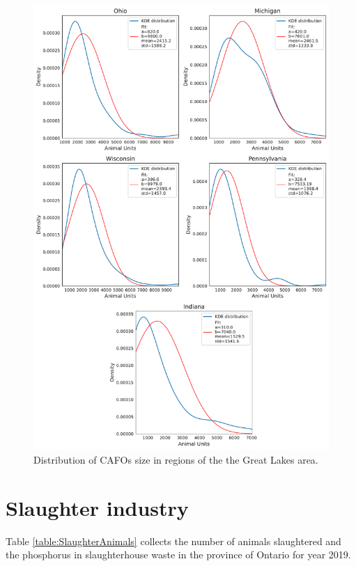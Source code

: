 \documentclass[authoryear]{elsarticle}
\begin{document}
\begin{figure}[H]
	\centering
	\includegraphics[width=0.81\linewidth, trim={0cm 0cm 0cm 0cm},clip]{SupMat_Figures/CAFOs_Size_Distribution} 
	\caption{Distribution of CAFOs size in regions of the the Great Lakes area.}
	\label{fig:CAFOsSizeDist}
\end{figure}

\section{Slaughter industry}
Table \ref{table:SlaughterAnimals} collects the number of animals slaughtered and the phosphorus in slaughterhouse waste in the province of Ontario for year 2019.
\end{document}

